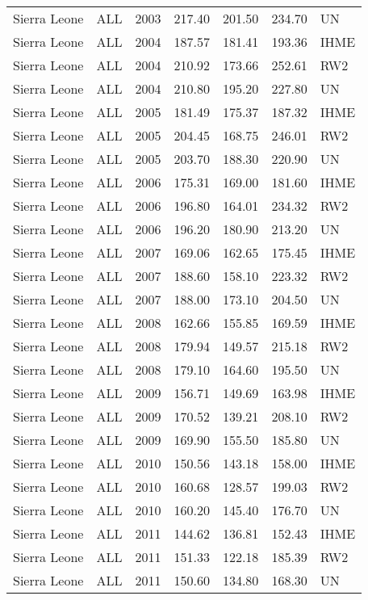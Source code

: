 \begin{longtable}{lllrrrl}
  Sierra Leone & ALL & 2003 & 217.40 & 201.50 & 234.70 & UN \\ 
  Sierra Leone & ALL & 2004 & 187.57 & 181.41 & 193.36 & IHME \\ 
  Sierra Leone & ALL & 2004 & 210.92 & 173.66 & 252.61 & RW2 \\ 
  Sierra Leone & ALL & 2004 & 210.80 & 195.20 & 227.80 & UN \\ 
  Sierra Leone & ALL & 2005 & 181.49 & 175.37 & 187.32 & IHME \\ 
  Sierra Leone & ALL & 2005 & 204.45 & 168.75 & 246.01 & RW2 \\ 
  Sierra Leone & ALL & 2005 & 203.70 & 188.30 & 220.90 & UN \\ 
  Sierra Leone & ALL & 2006 & 175.31 & 169.00 & 181.60 & IHME \\ 
  Sierra Leone & ALL & 2006 & 196.80 & 164.01 & 234.32 & RW2 \\ 
  Sierra Leone & ALL & 2006 & 196.20 & 180.90 & 213.20 & UN \\ 
  Sierra Leone & ALL & 2007 & 169.06 & 162.65 & 175.45 & IHME \\ 
  Sierra Leone & ALL & 2007 & 188.60 & 158.10 & 223.32 & RW2 \\ 
  Sierra Leone & ALL & 2007 & 188.00 & 173.10 & 204.50 & UN \\ 
  Sierra Leone & ALL & 2008 & 162.66 & 155.85 & 169.59 & IHME \\ 
  Sierra Leone & ALL & 2008 & 179.94 & 149.57 & 215.18 & RW2 \\ 
  Sierra Leone & ALL & 2008 & 179.10 & 164.60 & 195.50 & UN \\ 
  Sierra Leone & ALL & 2009 & 156.71 & 149.69 & 163.98 & IHME \\ 
  Sierra Leone & ALL & 2009 & 170.52 & 139.21 & 208.10 & RW2 \\ 
  Sierra Leone & ALL & 2009 & 169.90 & 155.50 & 185.80 & UN \\ 
  Sierra Leone & ALL & 2010 & 150.56 & 143.18 & 158.00 & IHME \\ 
  Sierra Leone & ALL & 2010 & 160.68 & 128.57 & 199.03 & RW2 \\ 
  Sierra Leone & ALL & 2010 & 160.20 & 145.40 & 176.70 & UN \\ 
  Sierra Leone & ALL & 2011 & 144.62 & 136.81 & 152.43 & IHME \\ 
  Sierra Leone & ALL & 2011 & 151.33 & 122.18 & 185.39 & RW2 \\ 
  Sierra Leone & ALL & 2011 & 150.60 & 134.80 & 168.30 & UN \\ 

\end{longtable}
